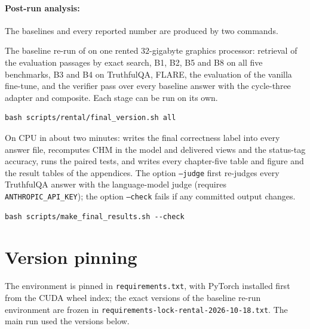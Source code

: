 \paragraph{Post-run analysis:} The baselines and every reported number are produced by two commands.
\begin{description}[style=nextline,leftmargin=0pt]
\item[Baseline panel under the comparison protocol:] The baseline re-run of  on one rented $32$-gigabyte graphics processor: retrieval of the evaluation passages by exact search, B1, B2, B5 and B8 on all five benchmarks, B3 and B4 on TruthfulQA, FLARE, the evaluation of the vanilla fine-tune, and the verifier pass over every baseline answer with the cycle-three adapter and composite. Each stage can be run on its own.
\begin{verbatim}
bash scripts/rental/final_version.sh all
\end{verbatim}
\item[Final numbers, tables and figures:] On CPU in about two minutes: writes the final correctness label into every answer file, recomputes CHM in the model and delivered views and the status-tag accuracy, runs the paired tests, and writes every chapter-five table and figure and the result tables of the appendices. The option \texttt{--judge} first re-judges every TruthfulQA answer with the language-model judge (requires \texttt{ANTHROPIC\_API\_KEY}); the option \texttt{--check} fails if any committed output changes.
\begin{verbatim}
bash scripts/make_final_results.sh --check
\end{verbatim}
\end{description}

\section{Version pinning}
\label{app:repro-versions}

The environment is pinned in \verb|requirements.txt|, with PyTorch installed first from the CUDA wheel index; the exact versions of the baseline re-run environment are frozen in \verb|requirements-lock-rental-2026-10-18.txt|. The main run used the versions below.

